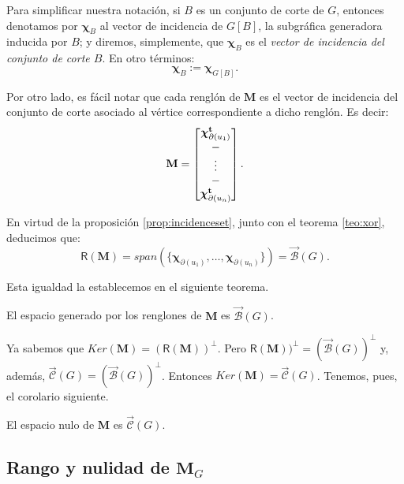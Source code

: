 Para simplificar nuestra notación, si $B$ es un conjunto de corte de $G$, entonces denotamos por $\boldsymbol{\chi}_{B}$ al vector de incidencia de $G[B]$, la subgráfica generadora inducida por $B$; y diremos, simplemente, que $\boldsymbol{\chi}_{B}$ es el \textit{vector de incidencia del conjunto de corte $B$}. En otro términos:
$$\boldsymbol{\chi}_{B}:= \boldsymbol{\chi}_{G[B]}.$$

Por otro lado, es fácil notar que cada renglón de $\mathbf{M}$ es el vector de incidencia del conjunto de corte asociado al vértice correspondiente a dicho renglón. Es decir:
$$\mathbf{M} = 
\begin{bmatrix}
\boldsymbol{\chi}_{\partial(u_{1})}^{\mathbf{t}}\\ 
\-- \\
\vdots \\
\-- \\
\boldsymbol{\chi}_{\partial(u_{n})}^{\mathbf{t}} 
\end{bmatrix}.
$$

En virtud de la proposición \ref{prop:incidenceset}, junto con el teorema \ref{teo:xor}, deducimos que:
$$
\mathsf{R}(\mathbf{M}) = span(\{ \boldsymbol{\chi}_{\partial(u_{1})}, \ldots, \boldsymbol{\chi}_{\partial(u_{n})} \}) = \overrightarrow{\mathcal{B}}(G).
$$

Esta igualdad la establecemos en el siguiente teorema.

\begin{teo}
\begin{center}
    El espacio generado por los renglones de $\mathbf{M}$ es $\overrightarrow{\mathcal{B}}(G)$.
\end{center}
\end{teo}

Ya sabemos que $Ker(\mathbf{M}) = (\textsf{R}(\mathbf{M}))^{\perp}$. Pero $\textsf{R}(\mathbf{M}))^{\perp} = (\overrightarrow{\mathcal{B}}(G))^{\perp}$ y, además, $\overrightarrow{\mathcal{C}}(G)=(\overrightarrow{\mathcal{B}}(G))^{\perp}$. Entonces $Ker(\mathbf{M}) =\overrightarrow{\mathcal{C}}(G) $. Tenemos, pues, el corolario siguiente. 

\begin{cor}
\begin{center}
    El espacio nulo de $\mathbf{M}$ es $\overrightarrow{\mathcal{C}}(G)$.
\end{center}
\end{cor}

\subsection{Rango y nulidad de $\mathbf{M}_{G}$}

